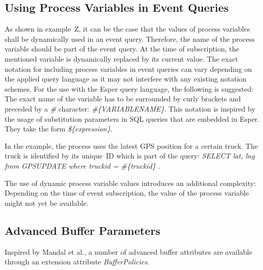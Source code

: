 \subsection{Using Process Variables in Event Queries}



As shown in example~Z, it can be the case that the values of process variables shall be dynamically used in an event query.
Therefore, the name of the process variable should be part of the event query. At the time of subscription, the mentioned variable is dynamically replaced by its current value.
The exact notation for including process variables in event queries can vary depending on the applied query language as it may not interfere with any existing notation schemes.
For the use with the Esper query language, the following is suggested: The exact name of the variable has to be surrounded by curly brackets and preceded by a \textit{\#} character: \textit{\#\{VARIABLENAME\}}.
This notation is inspired by the usage of substitution parameters in SQL queries that are embedded in Esper. They take the form \textit{\$\{expression\}}.

In the example, the process uses the latest GPS position for a certain truck. The truck is identified by its unique~ID which is part of the query: \textit{SELECT lat, lng from GPSUPDATE where truckid = \#\{truckid\} }.

The use of dynamic process variable values introduces an additional complexity: Depending on the time of event subscription, the value of the process variable might not yet be available.


\subsection{Advanced Buffer Parameters}\label{ch:bpmnx:bufferpolicies}
Inspired by Mandal et al., a number of advanced buffer attributes are available through an extension attribute \textit{BufferPolicies}.

